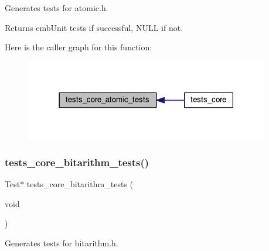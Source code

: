 Generates tests for atomic.\+h. 

\begin{DoxyReturn}{Returns}
emb\+Unit tests if successful, N\+U\+LL if not. 
\end{DoxyReturn}
Here is the caller graph for this function\+:
\nopagebreak
\begin{figure}[H]
\begin{center}
\leavevmode
\includegraphics[width=302pt]{group__unittests_gadc7f89b561245603549db45a06d93cce_icgraph}
\end{center}
\end{figure}
\mbox{\label{group__unittests_ga0e92d30389bd2bf5e8482efa37e34733}} 
\subsubsection{\texorpdfstring{tests\+\_\+core\+\_\+bitarithm\+\_\+tests()}{tests\_core\_bitarithm\_tests()}}
{\footnotesize\ttfamily Test$\ast$ tests\+\_\+core\+\_\+bitarithm\+\_\+tests (\begin{DoxyParamCaption}\item[{void}]{ }\end{DoxyParamCaption})}



Generates tests for bitarithm.\+h. 

